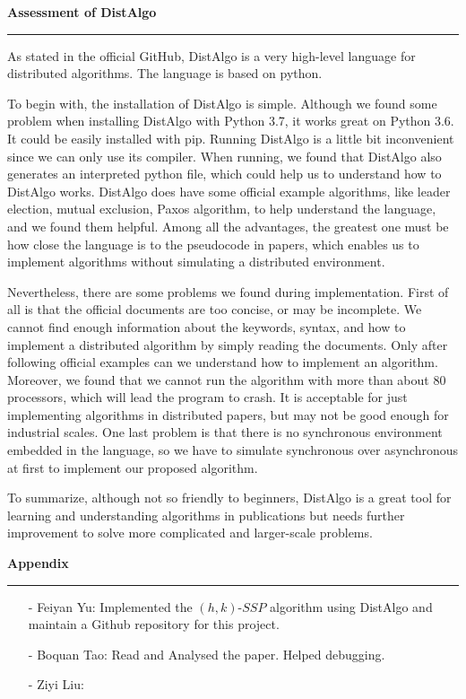 \documentclass[11pt]{article}  %
\begin{document}
{\bf Assessment of DistAlgo}

\rule{6in}{.1pt}       %

As stated in the official GitHub, DistAlgo is a very high-level language for distributed algorithms. The language is based on python.\par
To begin with, the installation of DistAlgo is simple. Although we found some problem when installing DistAlgo with Python 3.7, it works great on Python 3.6. It could be easily installed with pip. Running DistAlgo is a little bit inconvenient since we can only use its compiler. When running, we found that DistAlgo also generates an interpreted python file, which could help us to understand how to DistAlgo works. DistAlgo does have some official example algorithms, like leader election, mutual exclusion, Paxos algorithm, to help understand the language, and we found them helpful. Among all the advantages, the greatest one must be how close the language is to the pseudocode in papers, which enables us to implement algorithms without simulating a distributed environment.\par
Nevertheless, there are some problems we found during implementation. First of all is that the official documents are too concise, or may be incomplete. We cannot find enough information about the keywords, syntax, and how to implement a distributed algorithm by simply reading the documents. Only after following official examples can we understand how to implement an algorithm. Moreover, we found that we cannot run the algorithm with more than about 80 processors, which will lead the program to crash. It is acceptable for just implementing algorithms in distributed papers, but may not be good enough for industrial scales. One last problem is that there is no synchronous environment embedded in the language, so we have to simulate synchronous over asynchronous at first to implement our proposed algorithm.\par
To summarize, although not so friendly to beginners, DistAlgo is a great tool for learning and understanding algorithms in publications but needs further improvement to solve more complicated and larger-scale problems.\par

{\bf Appendix}

\rule{6in}{.1pt}       %

\begin{enumerate}
    \item[-]Feiyan Yu: Implemented the $(h,k)$-$SSP$ algorithm using DistAlgo and maintain a Github repository for this project.
	\item[-]Boquan Tao: Read and Analysed the paper. Helped debugging.
	\item[-]Ziyi Liu:
\end{enumerate}
\end{document}
